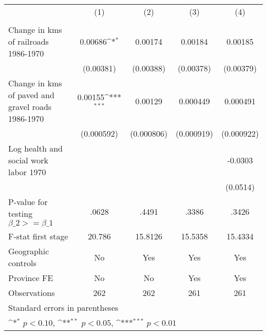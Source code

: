 {
\def\sym#1{\ifmmode^{#1}\else\(^{#1}\)\fi}
\begin{tabular}{l*{4}{c}}
\hline\hline
                &\multicolumn{1}{c}{(1)}&\multicolumn{1}{c}{(2)}&\multicolumn{1}{c}{(3)}&\multicolumn{1}{c}{(4)}\\
                &\multicolumn{1}{c}{}&\multicolumn{1}{c}{}&\multicolumn{1}{c}{}&\multicolumn{1}{c}{}\\
\hline
Change in kms of railroads 1986-1970&  0.00686\sym{*}  &  0.00174         &  0.00184         &  0.00185         \\
                &(0.00381)         &(0.00388)         &(0.00378)         &(0.00379)         \\
[1em]
Change in kms of paved and gravel roads 1986-1970&  0.00155\sym{***}&  0.00129         & 0.000449         & 0.000491         \\
                &(0.000592)         &(0.000806)         &(0.000919)         &(0.000922)         \\
[1em]
Log health and social work labor 1970&                  &                  &                  &  -0.0303         \\
                &                  &                  &                  & (0.0514)         \\
\hline
P-value for testing $\beta\_{2} >= \beta\_{1}$&    .0628         &    .4491         &    .3386         &    .3426         \\
F-stat first stage&   20.786         &  15.8126         &  15.5358         &  15.4334         \\
Geographic controls&       No         &      Yes         &      Yes         &      Yes         \\
Province FE     &       No         &       No         &      Yes         &      Yes         \\
Observations    &      262         &      262         &      261         &      261         \\
\hline\hline
\multicolumn{5}{l}{\footnotesize Standard errors in parentheses}\\
\multicolumn{5}{l}{\footnotesize \sym{*} \(p<0.10\), \sym{**} \(p<0.05\), \sym{***} \(p<0.01\)}\\
\end{tabular}
}
